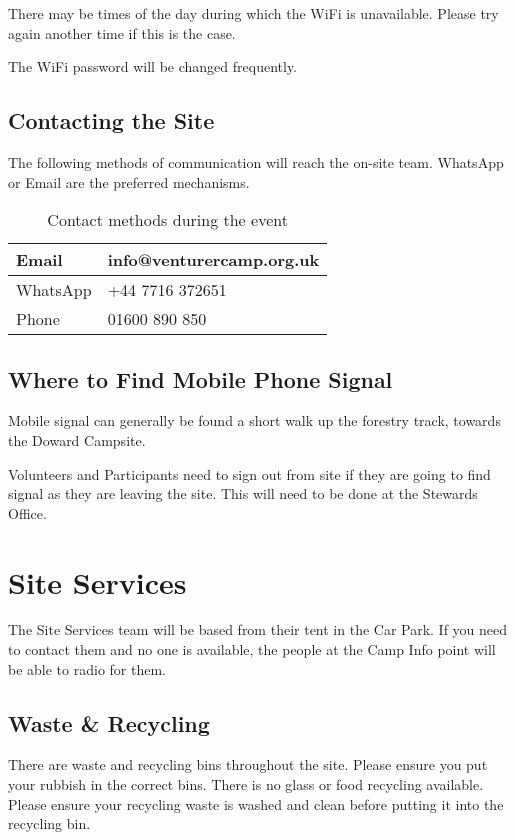 \documentclass[a4paper, 11pt]{report}
\begin{document}
There may be times of the day during which the WiFi is unavailable. Please try again another time if this is the case.\nl

The WiFi password will be changed frequently.

\section{Contacting the Site}
The following methods of communication will reach the on-site team. WhatsApp or Email are the preferred mechanisms.
\begin{table}[H]
    \centering
    \begin{tabular}{p{} p{}}
        \hline
        Email & info@venturercamp.org.uk\\
        \hline
        WhatsApp & +44 7716 372651\\
        \hline
        Phone & 01600 890 850\\
        \hline
    \end{tabular}
    \caption{Contact methods during the event}
\end{table}

\section{Where to Find Mobile Phone Signal}
Mobile signal can generally be found a short walk up the forestry track, towards the Doward Campsite.\nl

Volunteers and Participants need to sign out from site if they are going to find signal as they are leaving the site. This will need to be done at the Stewards Office.

\chapter{Site Services}
The Site Services team will be based from their tent in the Car Park. If you need to contact them and no one is available, the people at the Camp Info point will be able to radio for them. 

\section{Waste \& Recycling}
There are waste and recycling bins throughout the site. Please ensure you put your rubbish in the correct bins. There is no glass or food recycling available. Please ensure your recycling waste is washed and clean before putting it into the recycling bin. 
\end{document}
